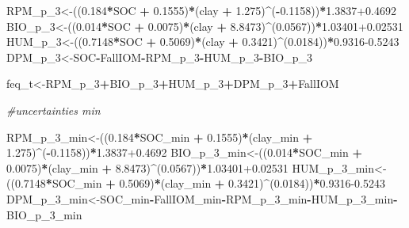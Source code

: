 \documentclass[
  10pt,
  b5paper,
]{book}
\newenvironment{Shaded}{\begin{snugshade}}{\end{snugshade}}
\newcommand{\CommentTok}[1]{\textcolor[rgb]{0.56,0.35,0.01}{\textit{#1}}}
\newcommand{\DecValTok}[1]{\textcolor[rgb]{0.00,0.00,0.81}{#1}}
\newcommand{\FloatTok}[1]{\textcolor[rgb]{0.00,0.00,0.81}{#1}}
\newcommand{\NormalTok}[1]{#1}
\newcommand{\OperatorTok}[1]{\textcolor[rgb]{0.81,0.36,0.00}{\textbf{#1}}}
\newcommand{\StringTok}[1]{\textcolor[rgb]{0.31,0.60,0.02}{#1}}
\begin{document}
\begin{Shaded}
\begin{Highlighting}[]
{\NormalTok{RPM_p_}\DecValTok{3}\NormalTok{<-((}\FloatTok{0.184}\OperatorTok{*}\NormalTok{SOC }\OperatorTok{+}\StringTok{ }\FloatTok{0.1555}\NormalTok{)}\OperatorTok{*}\NormalTok{(clay }\OperatorTok{+}\StringTok{ }\FloatTok{1.275}\NormalTok{)}\OperatorTok{^}\NormalTok{(}\OperatorTok{-}\FloatTok{0.1158}\NormalTok{))}\OperatorTok{*}\FloatTok{1.3837+0.4692}
\NormalTok{BIO_p_}\DecValTok{3}\NormalTok{<-((}\FloatTok{0.014}\OperatorTok{*}\NormalTok{SOC }\OperatorTok{+}\StringTok{ }\FloatTok{0.0075}\NormalTok{)}\OperatorTok{*}\NormalTok{(clay }\OperatorTok{+}\StringTok{ }\FloatTok{8.8473}\NormalTok{)}\OperatorTok{^}\NormalTok{(}\FloatTok{0.0567}\NormalTok{))}\OperatorTok{*}\FloatTok{1.03401+0.02531}
\NormalTok{HUM_p_}\DecValTok{3}\NormalTok{<-((}\FloatTok{0.7148}\OperatorTok{*}\NormalTok{SOC }\OperatorTok{+}\StringTok{ }\FloatTok{0.5069}\NormalTok{)}\OperatorTok{*}\NormalTok{(clay }\OperatorTok{+}\StringTok{ }\FloatTok{0.3421}\NormalTok{)}\OperatorTok{^}\NormalTok{(}\FloatTok{0.0184}\NormalTok{))}\OperatorTok{*}\FloatTok{0.9316-0.5243}
\NormalTok{DPM_p_}\DecValTok{3}\NormalTok{<-SOC}\OperatorTok{-}\NormalTok{FallIOM}\OperatorTok{-}\NormalTok{RPM_p_}\DecValTok{3}\OperatorTok{-}\NormalTok{HUM_p_}\DecValTok{3}\OperatorTok{-}\NormalTok{BIO_p_}\DecValTok{3}

\NormalTok{feq_t<-RPM_p_}\DecValTok{3}\OperatorTok{+}\NormalTok{BIO_p_}\DecValTok{3}\OperatorTok{+}\NormalTok{HUM_p_}\DecValTok{3}\OperatorTok{+}\NormalTok{DPM_p_}\DecValTok{3}\OperatorTok{+}\NormalTok{FallIOM}

\CommentTok{#uncertainties min}

\NormalTok{RPM_p_}\DecValTok{3}\NormalTok{_min<-((}\FloatTok{0.184}\OperatorTok{*}\NormalTok{SOC_min }\OperatorTok{+}\StringTok{ }\FloatTok{0.1555}\NormalTok{)}\OperatorTok{*}\NormalTok{(clay_min }\OperatorTok{+}\StringTok{ }\FloatTok{1.275}\NormalTok{)}\OperatorTok{^}\NormalTok{(}\OperatorTok{-}\FloatTok{0.1158}\NormalTok{))}\OperatorTok{*}\FloatTok{1.3837+0.4692}
\NormalTok{BIO_p_}\DecValTok{3}\NormalTok{_min<-((}\FloatTok{0.014}\OperatorTok{*}\NormalTok{SOC_min }\OperatorTok{+}\StringTok{ }\FloatTok{0.0075}\NormalTok{)}\OperatorTok{*}\NormalTok{(clay_min }\OperatorTok{+}\StringTok{ }\FloatTok{8.8473}\NormalTok{)}\OperatorTok{^}\NormalTok{(}\FloatTok{0.0567}\NormalTok{))}\OperatorTok{*}\FloatTok{1.03401+0.02531}
\NormalTok{HUM_p_}\DecValTok{3}\NormalTok{_min<-((}\FloatTok{0.7148}\OperatorTok{*}\NormalTok{SOC_min }\OperatorTok{+}\StringTok{ }\FloatTok{0.5069}\NormalTok{)}\OperatorTok{*}\NormalTok{(clay_min }\OperatorTok{+}\StringTok{ }\FloatTok{0.3421}\NormalTok{)}\OperatorTok{^}\NormalTok{(}\FloatTok{0.0184}\NormalTok{))}\OperatorTok{*}\FloatTok{0.9316-0.5243}
\NormalTok{DPM_p_}\DecValTok{3}\NormalTok{_min<-SOC_min}\OperatorTok{-}\NormalTok{FallIOM_min}\OperatorTok{-}\NormalTok{RPM_p_}\DecValTok{3}\NormalTok{_min}\OperatorTok{-}\NormalTok{HUM_p_}\DecValTok{3}\NormalTok{_min}\OperatorTok{-}\NormalTok{BIO_p_}\DecValTok{3}\NormalTok{_min}

}
\end{Highlighting}
\end{Shaded}
\end{document}
